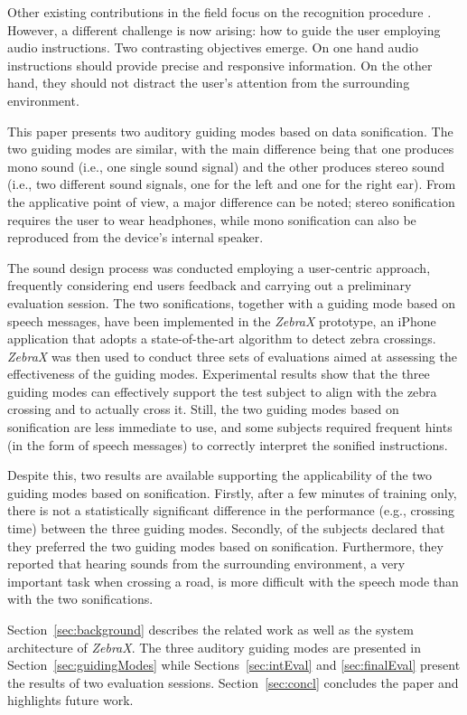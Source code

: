 \documentclass{article}
\newcommand{\zebra}{\emph{ZebraX}}
\begin{document}
Other existing contributions in the field focus on the recognition procedure \cite{se,uddin1,uddin2,ivanchenko,ivanchenko2,dragan}. However, a different challenge is now arising: how to guide the user employing audio instructions.
Two contrasting objectives emerge. On one hand audio instructions should provide precise and responsive information. On the other hand, they should not distract the user's attention from the surrounding environment.

This paper presents two auditory guiding modes based on data sonification.
The two guiding modes are similar, with the main difference being that one produces mono sound (i.e., one single sound signal) and the other produces stereo sound (i.e., two different sound signals, one for the left and one for the right ear).
From the applicative point of view, a major difference can be noted; stereo sonification requires the user to wear headphones, while mono sonification can also be reproduced from the device's internal speaker.

The sound design process was conducted employing a user-centric approach, frequently considering end users feedback and carrying out a preliminary evaluation session. The two sonifications, together with a guiding mode based on speech messages, have been implemented in the \zebra{} prototype, an iPhone application that adopts a state-of-the-art algorithm to detect zebra crossings.
\zebra{} was then used to conduct three sets of evaluations aimed at assessing the effectiveness of the guiding modes.
Experimental results show that the three guiding modes can effectively support the test subject to align with the zebra crossing and to actually cross it.
Still, the two guiding modes based on sonification are less immediate to use, and some subjects required frequent hints (in the form of speech messages) to correctly interpret the sonified instructions.

Despite this, two results are available supporting the applicability of the two guiding modes based on sonification.
Firstly, after a few minutes of training only, there is not a statistically significant difference in the performance (e.g., crossing time) between the three guiding modes.
Secondly,   of  the  subjects  declared  that  they preferred  the two guiding modes based on sonification. Furthermore, they reported that hearing sounds from the surrounding environment, a very important task when crossing a road, is more difficult with the speech mode than with the two sonifications.

Section~\ref{sec:background} describes the related work as well as the system architecture of \zebra{}. The three auditory guiding modes are presented in Section~\ref{sec:guidingModes} while Sections~\ref{sec:intEval} and \ref{sec:finalEval} present the results of two evaluation sessions. Section~\ref{sec:concl} concludes the paper and highlights future work.
\end{document}
